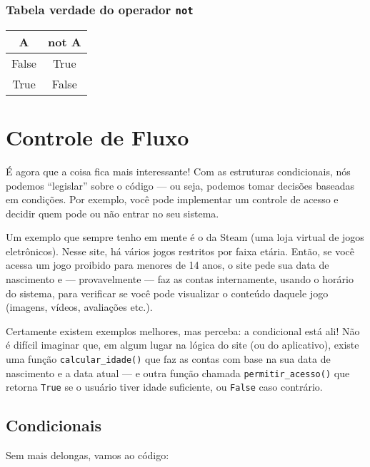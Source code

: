 \documentclass[12pt]{book}
\begin{document}
	
	\subsection*{Tabela verdade do operador \texttt{not}}
	
	\begin{center}
		\begin{tabular}{|c|c|}
			\hline
			\textbf{A} & \textbf{not A} \\
			\hline
			False & True  \\
			True  & False \\
			\hline
		\end{tabular}
	\end{center}
	
	\chapter{Controle de Fluxo}
	
	
	É agora que a coisa fica mais interessante! Com as estruturas condicionais, nós podemos “legislar” sobre o código — ou seja, podemos tomar decisões baseadas em condições. Por exemplo, você pode implementar um controle de acesso e decidir quem pode ou não entrar no seu sistema.
	
	Um exemplo que sempre tenho em mente é o da Steam (uma loja virtual de jogos eletrônicos). Nesse site, há vários jogos restritos por faixa etária. Então, se você acessa um jogo proibido para menores de 14 anos, o site pede sua data de nascimento e — provavelmente — faz as contas internamente, usando o horário do sistema, para verificar se você pode visualizar o conteúdo daquele jogo (imagens, vídeos, avaliações etc.).
	
	Certamente existem exemplos melhores, mas perceba: a condicional está ali! Não é difícil imaginar que, em algum lugar na lógica do site (ou do aplicativo), existe uma função \texttt{calcular\_idade()} que faz as contas com base na sua data de nascimento e a data atual — e outra função chamada \texttt{permitir\_acesso()} que retorna \verb*|True| se o usuário tiver idade suficiente, ou \verb*|False| caso contrário.


	\section{Condicionais}
	Sem mais delongas, vamos ao código:
	
\end{document}
